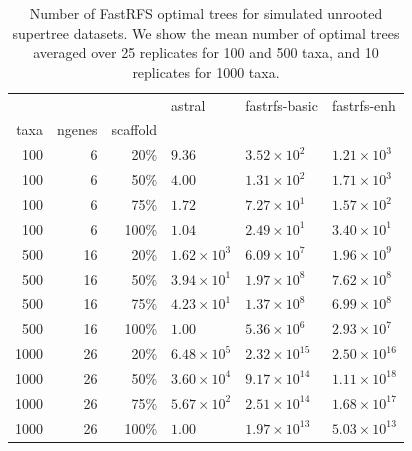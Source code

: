 \begin{table}[h]
\centering

\begin{tabular}{|rrr|lll|}
 
\hline
 & & & astral & fastrfs-basic & fastrfs-enh\\
taxa&ngenes&scaffold&&&\\


\hline 
\hline
100&6&20\%	&$9.36$	&$3.52\times 10^{2}$	&$1.21\times 10^{3}$\\
100&6&50\%	&$4.00$	&$1.31\times 10^{2}$	&$1.71\times 10^{3}$\\
100&6&75\%	&$1.72$	&$7.27\times 10^{1}$	&$1.57\times 10^{2}$\\
100&6&100\%	&$1.04$	&$2.49\times 10^{1}$	&$3.40\times 10^{1}$\\
\hline
500&16&20\%	&$1.62\times 10^{3}$	&$6.09\times 10^{7}$	&$1.96\times 10^{9}$\\
500&16&50\%	&$3.94\times 10^{1}$	&$1.97\times 10^{8}$	&$7.62\times 10^{8}$\\
500&16&75\%	&$4.23\times 10^{1}$	&$1.37\times 10^{8}$	&$6.99\times 10^{8}$\\
500&16&100\%	&$1.00$	&$5.36\times 10^{6}$	&$2.93\times 10^{7}$\\
\hline
1000&26&20\%	&$6.48\times 10^{5}$	&$2.32\times 10^{15}$	&$2.50\times 10^{16}$\\
1000&26&50\%	&$3.60\times 10^{4}$	&$9.17\times 10^{14}$	&$1.11\times 10^{18}$\\
1000&26&75\%	&$5.67\times 10^{2}$	&$2.51\times 10^{14}$	&$1.68\times 10^{17}$\\
1000&26&100\%	&$1.00$	&$1.97\times 10^{13}$	&$5.03\times 10^{13}$\\
\hline
\end{tabular}

\caption[Number of FastRFS optimal trees for simulated
  unrooted supertree datasets.]{Number of FastRFS optimal trees for simulated
  unrooted supertree datasets. We show the mean number
  of optimal trees averaged over 25 replicates for 100 and 500 taxa,
  and 10 replicates for 1000 taxa.} \label{tab:supertree_counts}
\end{table}


